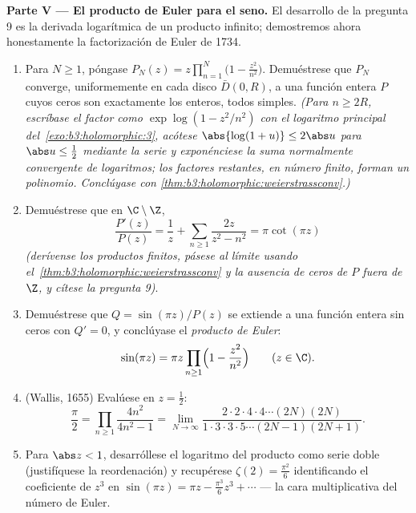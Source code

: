 \begin{problem}
\medskip
\noindent\textbf{Parte V --- El producto de Euler para el seno.} El
desarrollo de la pregunta 9 es la derivada logarítmica de un producto
infinito; demostremos ahora honestamente la factorización de Euler de
1734.
\begin{enumerate}[resume]
  \item Para $N \geq 1$, póngase $P_N(z) =
        z\prod_{n=1}^{N}\bigl(1 - \frac{z^2}{n^2}\bigr)$. Demuéstrese
  que $P_N$ converge, uniformemente en cada disco $\bar D(0, R)$, a una
  función entera $P$ cuyos ceros son exactamente los enteros, todos
  simples. \emph{(Para $n
        \geq 2R$, escríbase el factor como $\exp\log(1 -
        z^2/n^2)$ con el logaritmo principal
  del~\cref{exo:b3:holomorphic:3}, acótese $\abs{\log(1+u)}
        \leq 2\abs u$ para $\abs u \leq \frac12$ mediante la serie y
  exponénciese la suma normalmente convergente de logaritmos; los
  factores restantes, en número finito, forman un polinomio. Conclúyase
  con
        \cref{thm:b3:holomorphic:weierstrassconv}.)}
  \item Demuéstrese que en $\C\setminus\Z$,
        \[
        \frac{P'(z)}{P(z)} = \frac1z +
        \sum_{n\geq1}\frac{2z}{z^2 - n^2} = \pi\cot(\pi z)
        \]
        \emph{(derívense los productos finitos, pásese al límite usando
        el~\cref{thm:b3:holomorphic:weierstrassconv} y la ausencia de
        ceros de $P$ fuera de $\Z$, y cítese la pregunta
        9)}.
  \item Demuéstrese que $Q = \sin(\pi z)/P(z)$ se extiende a una función
  entera sin ceros con $Q' = 0$, y conclúyase el \emph{producto de
  Euler}:
        \[
        \sin(\pi z) = \pi z\prod_{n\geq1}
        \Bigl(1 - \frac{z^2}{n^2}\Bigr)
        \qquad (z \in \C) .
        \]
  \item (Wallis, 1655) Evalúese en $z = \frac12$:
        \[
        \frac\pi2 = \prod_{n\geq1}\frac{4n^2}{4n^2 - 1}
        = \lim_{N\to\infty}
        \frac{2\cdot2\cdot4\cdot4\cdots(2N)(2N)}
        {1\cdot3\cdot3\cdot5\cdots(2N-1)(2N+1)} .
        \]
  \item Para $\abs z < 1$, desarróllese el logaritmo del producto como
  serie doble (justifíquese la reordenación) y recupérese $\zeta(2) =
        \frac{\pi^2}6$ identificando el coeficiente de $z^3$ en
  $\sin(\pi z) = \pi z - \frac{\pi^3}6z^3 + \cdots$ --- la cara
  multiplicativa del número de Euler.
\end{enumerate}


\end{problem}
